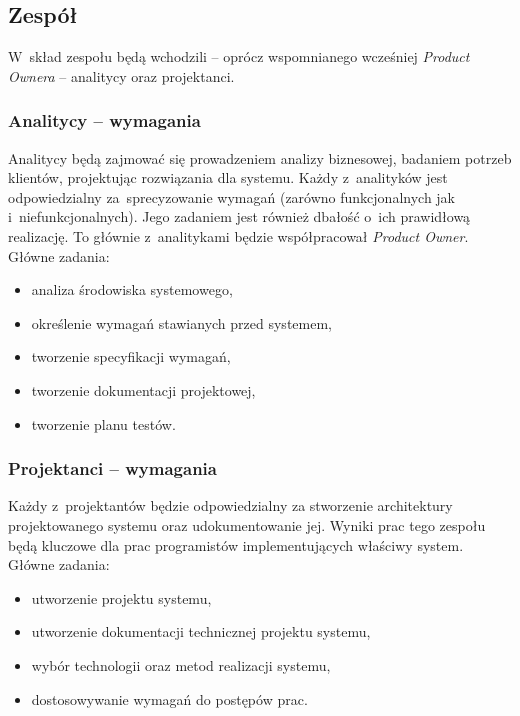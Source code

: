 \newpage
\subsection{Zespół}
W~skład zespołu będą wchodzili -- oprócz wspomnianego wcześniej \emph{Product Ownera} -- analitycy oraz projektanci.

\subsubsection{Analitycy -- wymagania}
Analitycy będą zajmować się prowadzeniem analizy biznesowej, badaniem potrzeb klientów, projektując rozwiązania dla systemu. Każdy z~analityków jest odpowiedzialny za~sprecyzowanie wymagań (zarówno funkcjonalnych jak i~niefunkcjonalnych). Jego zadaniem jest również dbałość o~ich prawidłową realizację. To głównie z~analitykami będzie współpracował \emph{Product Owner}.\\

Główne zadania:
\begin{itemize}
  \item analiza środowiska systemowego,
  \item określenie wymagań stawianych przed systemem,
  \item tworzenie specyfikacji wymagań,
  \item tworzenie dokumentacji projektowej,
  \item tworzenie planu testów.
\end{itemize}

\subsubsection{Projektanci -- wymagania}
Każdy z~projektantów będzie odpowiedzialny za stworzenie architektury projektowanego systemu oraz udokumentowanie jej. Wyniki prac tego zespołu będą kluczowe dla prac programistów implementujących właściwy system.\\

Główne zadania:
\begin{itemize}
  \item utworzenie projektu systemu,
  \item utworzenie dokumentacji technicznej projektu systemu,
  \item wybór technologii oraz metod realizacji systemu,
  \item dostosowywanie wymagań do postępów prac.
\end{itemize}

